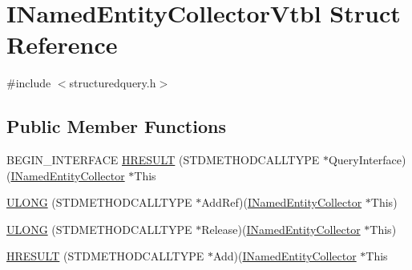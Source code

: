 \hypertarget{struct_i_named_entity_collector_vtbl}{}\section{I\+Named\+Entity\+Collector\+Vtbl Struct Reference}
\label{struct_i_named_entity_collector_vtbl}


{\ttfamily \#include $<$structuredquery.\+h$>$}

\subsection*{Public Member Functions}
\begin{DoxyCompactItemize}
\item 
B\+E\+G\+I\+N\+\_\+\+I\+N\+T\+E\+R\+F\+A\+CE \hyperlink{struct_i_named_entity_collector_vtbl_aa35704e27bb9948bccd61b9c6439a7ba}{H\+R\+E\+S\+U\+LT} (S\+T\+D\+M\+E\+T\+H\+O\+D\+C\+A\+L\+L\+T\+Y\+PE $\ast$Query\+Interface)(\hyperlink{structuredquery_8h_ac97315faed5d1bf8f6925adc37037418}{I\+Named\+Entity\+Collector} $\ast$This
\item 
\hyperlink{struct_i_named_entity_collector_vtbl_af593c0f31c0f80342fbc99faa83c6f2b}{U\+L\+O\+NG} (S\+T\+D\+M\+E\+T\+H\+O\+D\+C\+A\+L\+L\+T\+Y\+PE $\ast$Add\+Ref)(\hyperlink{structuredquery_8h_ac97315faed5d1bf8f6925adc37037418}{I\+Named\+Entity\+Collector} $\ast$This)
\item 
\hyperlink{struct_i_named_entity_collector_vtbl_aa59461fefac18f7b42e6efaf35c1db31}{U\+L\+O\+NG} (S\+T\+D\+M\+E\+T\+H\+O\+D\+C\+A\+L\+L\+T\+Y\+PE $\ast$Release)(\hyperlink{structuredquery_8h_ac97315faed5d1bf8f6925adc37037418}{I\+Named\+Entity\+Collector} $\ast$This)
\item 
\hyperlink{struct_i_named_entity_collector_vtbl_aa4a78285e78a1ba9074435f37cc570ed}{H\+R\+E\+S\+U\+LT} (S\+T\+D\+M\+E\+T\+H\+O\+D\+C\+A\+L\+L\+T\+Y\+PE $\ast$Add)(\hyperlink{structuredquery_8h_ac97315faed5d1bf8f6925adc37037418}{I\+Named\+Entity\+Collector} $\ast$This
\end{DoxyCompactItemize}
